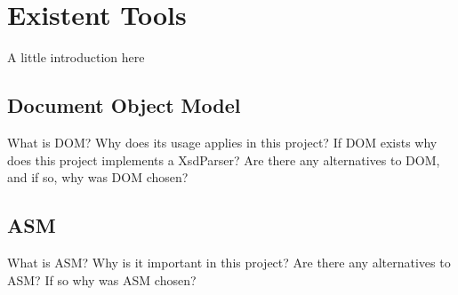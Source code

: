 \chapter{Existent Tools}
\label{cha:tools}

A little introduction here

\section{Document Object Model} %
\label{sec:dom}

What is DOM? Why does its usage applies in this project? If DOM exists why does this project implements a XsdParser? Are there any alternatives to DOM, and if so, why was DOM chosen?

\section{ASM} %
\label{sec:asm}

What is ASM? Why is it important in this project? Are there any alternatives to ASM? If so why was ASM chosen?